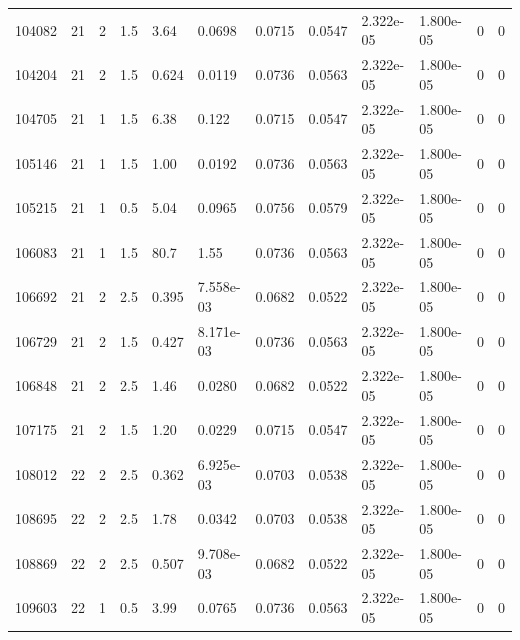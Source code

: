 \documentclass[preview]{standalone}
\begin{document}
{{{\begin{tabular}{L{1.2cm}C{1.2cm} C{0.3cm}C{0.5cm} C{1.4cm}C{1.4cm} C{1.4cm}C{1.4cm} C{1.6cm}C{1.6cm} C{1.6cm}C{1.6cm}}
  104082  &    21  & 2     & 1.5 &  3.64  & 0.0698  &  0.0715&   0.0547& 2.322e-05 & 1.800e-05   &  0 & 0  \\ 
  104204  &    21  & 2     & 1.5 &  0.624  & 0.0119  &  0.0736&   0.0563& 2.322e-05 & 1.800e-05   &  0 & 0  \\ 
  104705  &    21  & 1     & 1.5 &  6.38  & 0.122  &  0.0715&   0.0547& 2.322e-05 & 1.800e-05   &  0 & 0  \\ 
  105146  &    21  & 1     & 1.5 &  1.00  & 0.0192  &  0.0736&   0.0563& 2.322e-05 & 1.800e-05   &  0 & 0  \\ 
  105215  &    21  & 1     & 0.5 &  5.04  & 0.0965  &  0.0756&   0.0579& 2.322e-05 & 1.800e-05   &  0 & 0  \\ 
  106083  &    21  & 1     & 1.5 &  80.7  & 1.55  &  0.0736&   0.0563& 2.322e-05 & 1.800e-05   &  0 & 0  \\ 
  106692  &    21  & 2     & 2.5 &  0.395  & 7.558e-03  &  0.0682&   0.0522& 2.322e-05 & 1.800e-05   &  0 & 0  \\ 
  106729  &    21  & 2     & 1.5 &  0.427  & 8.171e-03  &  0.0736&   0.0563& 2.322e-05 & 1.800e-05   &  0 & 0  \\ 
  106848  &    21  & 2     & 2.5 &  1.46  & 0.0280  &  0.0682&   0.0522& 2.322e-05 & 1.800e-05   &  0 & 0  \\ 
  107175  &    21  & 2     & 1.5 &  1.20  & 0.0229  &  0.0715&   0.0547& 2.322e-05 & 1.800e-05   &  0 & 0  \\ 
  108012  &    22  & 2     & 2.5 &  0.362  & 6.925e-03  &  0.0703&   0.0538& 2.322e-05 & 1.800e-05   &  0 & 0  \\ 
  108695  &    22  & 2     & 2.5 &  1.78  & 0.0342  &  0.0703&   0.0538& 2.322e-05 & 1.800e-05   &  0 & 0  \\ 
  108869  &    22  & 2     & 2.5 &  0.507  & 9.708e-03  &  0.0682&   0.0522& 2.322e-05 & 1.800e-05   &  0 & 0  \\ 
  109603  &    22  & 1     & 0.5 &  3.99  & 0.0765  &  0.0736&   0.0563& 2.322e-05 & 1.800e-05   &  0 & 0  \\ 
\hline 
\end{tabular} 

}}}
\end{document}

